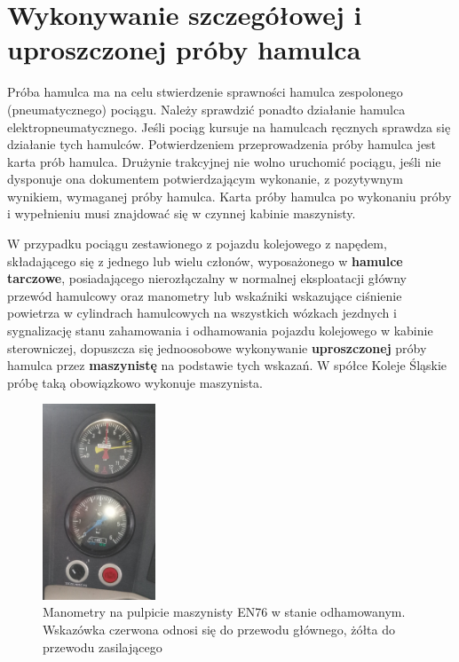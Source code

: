 \chapter{Wykonywanie szczegółowej i uproszczonej próby hamulca}

Próba hamulca ma na celu stwierdzenie sprawności hamulca zespolonego (pneumatycznego) pociągu. Należy sprawdzić ponadto działanie hamulca elektropneumatycznego. Jeśli pociąg kursuje na hamulcach ręcznych sprawdza się działanie tych hamulców. Potwierdzeniem przeprowadzenia próby hamulca jest karta prób hamulca. Drużynie trakcyjnej nie wolno uruchomić pociągu, jeśli nie dysponuje ona dokumentem potwierdzającym wykonanie, z pozytywnym wynikiem, wymaganej próby hamulca.
Karta próby hamulca po wykonaniu próby i wypełnieniu musi znajdować się w czynnej kabinie maszynisty.

W przypadku pociągu zestawionego z pojazdu kolejowego z napędem, składającego się z jednego lub wielu członów, wyposażonego w\textbf{ hamulce tarczowe}, posiadającego nierozłączalny w normalnej eksploatacji główny przewód hamulcowy oraz manometry lub wskaźniki wskazujące ciśnienie powietrza w cylindrach hamulcowych na wszystkich wózkach jezdnych i sygnalizację stanu zahamowania i odhamowania pojazdu kolejowego w kabinie sterowniczej, dopuszcza się jednoosobowe wykonywanie \textbf{uproszczonej} próby hamulca przez \textbf{maszynistę} na podstawie tych wskazań. W spółce Koleje Śląskie próbę taką obowiązkowo wykonuje maszynista.
\begin{figure}
	\centering
	\includegraphics[width=0.3\textwidth]{skryptkierownik-img/manometry-odhamowane.jpg}
	\caption{Manometry na pulpicie maszynisty EN76 w stanie odhamowanym. Wskazówka czerwona odnosi się do przewodu głównego, żółta do przewodu zasilającego}
\end{figure}

